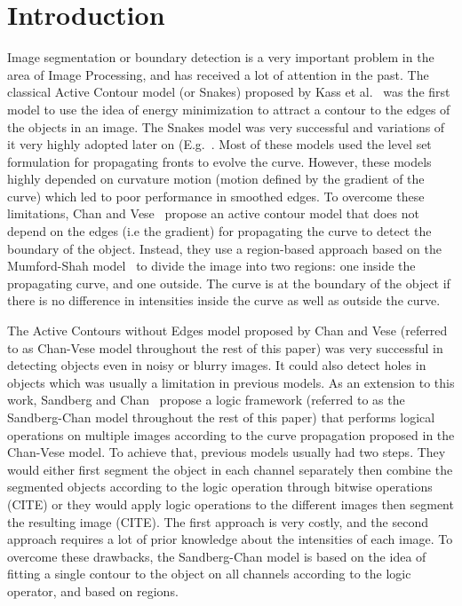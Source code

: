 \documentclass[10pt,twocolumn,letterpaper]{article}
\begin{document}
\section{Introduction}
Image segmentation or boundary detection is a very important problem in the area of Image Processing, and has received a lot of attention in the past. The
classical Active Contour model (or Snakes) proposed by Kass et al.~\cite{kass1988snakes} was the first model to use the idea of energy minimization to attract
a contour to the edges of the objects in an image. The Snakes model was very successful and variations of it very highly adopted later on
(E.g.~\cite{caselles1997geodesic}. Most of these models used the level set formulation for propagating fronts to evolve the curve. However, these models highly
depended on curvature motion (motion defined by the gradient of the curve) which led to poor performance in smoothed edges. To overcome these limitations, Chan
and Vese~\cite{chan2001active} propose an active contour model that does not depend on the edges (i.e the gradient) for propagating the curve to detect the
boundary of the object. Instead, they use a region-based approach based on the Mumford-Shah model~\cite{mumford1989optimal} to divide the image
into two regions: one inside the propagating curve, and one outside. The curve is at the boundary of the object if there is no difference in intensities inside
the curve as well as outside the curve.

The Active Contours without Edges model proposed by Chan and Vese (referred to as Chan-Vese model throughout the rest of this paper) was very successful in
detecting objects even in noisy or blurry images. It could also detect holes in objects which was usually a limitation in previous models. As an extension to
this work, Sandberg and Chan~\cite{sandberg2005logic} propose a logic framework (referred to as the Sandberg-Chan model throughout the rest of this
paper) that  performs logical operations on multiple images according to the curve propagation proposed in the Chan-Vese model. To achieve that, previous models
usually had two steps. They would either first segment the object in each channel separately then combine the segmented objects according to the logic operation
through bitwise operations (CITE) or they would apply logic operations to the different images then segment the resulting image (CITE). The first approach is
very costly, and the second approach requires a lot of prior knowledge about the intensities of each image. To overcome these drawbacks, the Sandberg-Chan
model is based on the idea of fitting a single contour to the object on all channels according to the logic operator, and based on regions.
\end{document}

